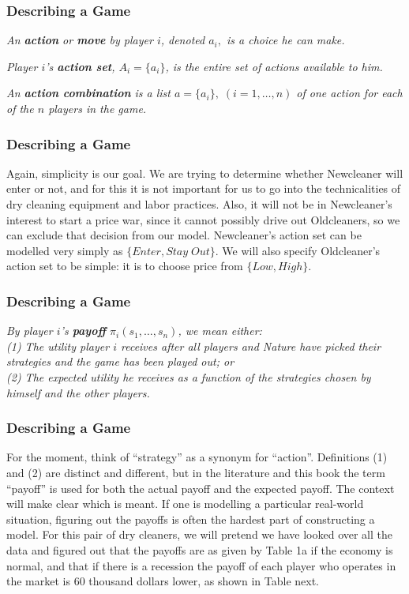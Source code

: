  \begin{frame}[fragile]\frametitle{Describing a Game}

 {\it An {\bf action} or {\bf move} by player $i$, denoted $a_{i},$ is
a choice he can make.}

 {\it Player $i$'s {\bf action set}, $A_i = \{a_{i}\}$, is the entire
set of actions available to him.}

 {\it An {\bf action combination} is a list $a =\{a_i\},\; (i=
1,\ldots,n)$ of one action for each of the $n$ players in the game.}
\end{frame}

 \begin{frame}[fragile]\frametitle{Describing a Game}

 Again, simplicity is our goal.  We are trying to determine whether Newcleaner
will enter or not, and for this  it is not important for us to go into the
technicalities of dry cleaning equipment and labor practices.   Also, it will
not be in Newcleaner's  interest to start a price war, since it cannot possibly
drive out Oldcleaners, so we can exclude that decision from our model.
Newcleaner's action set can be modelled very simply as  $  \{ Enter, Stay \;
Out\}$.  We will also specify  Oldcleaner's action set to be  simple: it is to
choose price from   $  \{ Low,   High\}$.
\end{frame}



 \begin{frame}[fragile]\frametitle{Describing a Game}

{\it By player $i$'s {\bf payoff} $\pi_i(s_1,\ldots,s_n)$, we mean
either:\\ (1) The utility player $i$ receives after all players and Nature have
picked their strategies and the game has been played out; or\\ (2) The expected
utility he receives as a function of the strategies chosen by himself and the
other players.}
\end{frame}

 \begin{frame}[fragile]\frametitle{Describing a Game}


   For the moment, think of ``strategy'' as a synonym for ``action''.
Definitions (1) and (2) are distinct and different, but in the literature and
this book the term ``payoff'' is used for both the actual payoff and the
expected payoff. The context will make clear which is meant.  If one is
modelling  a particular  real-world situation,  figuring out the payoffs is
often the hardest part of constructing a model.  For this pair of dry cleaners,
we will pretend we have looked over all the data and figured out that the
payoffs are as given by Table  1a   if the economy is normal, and that if there
is a recession   the  payoff of each player who   operates in the market is
60 thousand dollars lower, as shown in Table next.
\end{frame}

